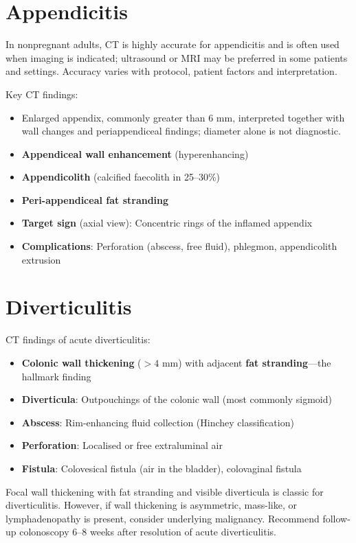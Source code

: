 \section{Appendicitis}
In nonpregnant adults, CT is highly accurate for appendicitis and is often used when imaging is indicated; ultrasound or MRI may be preferred in some patients and settings. Accuracy varies with protocol, patient factors and interpretation.

Key CT findings:
\begin{itemize}
  \item Enlarged appendix, commonly greater than 6 mm, interpreted together with wall changes and periappendiceal findings; diameter alone is not diagnostic.
  \item \textbf{Appendiceal wall enhancement} (hyperenhancing)
  \item \textbf{Appendicolith} (calcified faecolith in 25--30\%)
  \item \textbf{Peri-appendiceal fat stranding}
  \item \textbf{Target sign} (axial view): Concentric rings of the inflamed appendix
  \item \textbf{Complications}: Perforation (abscess, free fluid), phlegmon, appendicolith extrusion
\end{itemize}


\section{Diverticulitis}
CT findings of acute diverticulitis:
\begin{itemize}
  \item \textbf{Colonic wall thickening} ($> 4$ mm) with adjacent \textbf{fat stranding}---the hallmark finding
  \item \textbf{Diverticula}: Outpouchings of the colonic wall (most commonly sigmoid)
  \item \textbf{Abscess}: Rim-enhancing fluid collection (Hinchey classification)
  \item \textbf{Perforation}: Localised or free extraluminal air
  \item \textbf{Fistula}: Colovesical fistula (air in the bladder), colovaginal fistula
\end{itemize}

\begin{pearlbox}
Focal wall thickening with fat stranding and visible diverticula is classic for diverticulitis. However, if wall thickening is asymmetric, mass-like, or lymphadenopathy is present, consider underlying malignancy. Recommend follow-up colonoscopy 6--8 weeks after resolution of acute diverticulitis.
\end{pearlbox}


